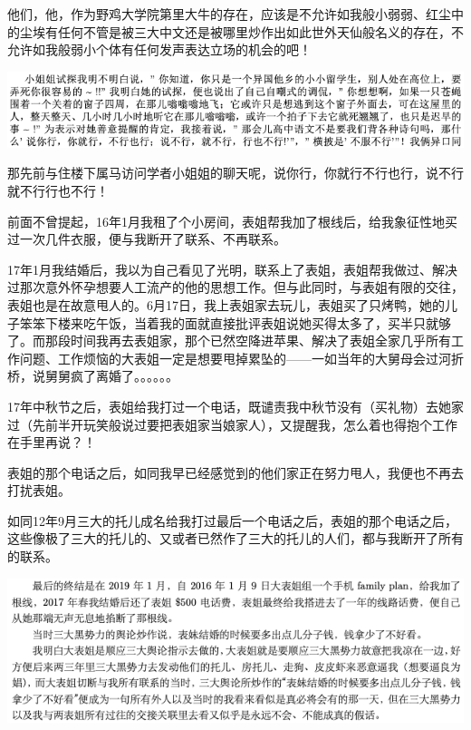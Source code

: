 \documentclass[9pt, b5paper]{article}
\begin{document}
他们，他，作为野鸡大学院第里大牛的存在，应该是不允许如我般小弱弱、红尘中的尘埃有任何不管是被三大中文还是被哪里炒作出如此世外天仙般名义的存在，不允许如我般弱小个体有任何发声表达立场的机会的吧！

\begin{center}
\includegraphics[width=.9\linewidth]{./pic/backups_plans_20210429_164915.png}
\end{center}

那先前与住楼下属马访问学者小姐姐的聊天呢，说你行，你就行不行也行，说不行就不行行也不行！

前面不曾提起，16年1月我租了个小房间，表姐帮我加了根线后，给我象征性地买过一次几件衣服，便与我断开了联系、不再联系。

17年1月我结婚后，我以为自己看见了光明，联系上了表姐，表姐帮我做过、解决过那次意外怀孕想要人工流产的他的思想工作。但与此同时，与表姐有限的交往，表姐也是在故意甩人的。6月17日，我上表姐家去玩儿，表姐买了只烤鸭，她的儿子笨笨下楼来吃午饭，当着我的面就直接批评表姐说她买得太多了，买半只就够了。而那段时间我再去表姐家，那个已然空降进苹果、解决了表姐全家几乎所有工作问题、工作烦恼的大表姐一定是想要甩掉累坠的——一如当年的大舅母会过河折桥，说舅舅疯了离婚了。。。。。。

17年中秋节之后，表姐给我打过一个电话，既谴责我中秋节没有（买礼物）去她家过（先前半开玩笑般说过要把表姐家当娘家人），又提醒我，怎么着也得抱个工作在手里再说？！

表姐的那个电话之后，如同我早已经感觉到的他们家正在努力甩人，我便也不再去打扰表姐。

如同12年9月三大的托儿成名给我打过最后一个电话之后，表姐的那个电话之后，这些像极了三大的托儿的、又或者已然作了三大的托儿的人们，都与我断开了所有的联系。

\begin{center}
\includegraphics[width=.9\linewidth]{./pic/backups_plans_20210430_110315.png}
\end{center}
\end{document}
